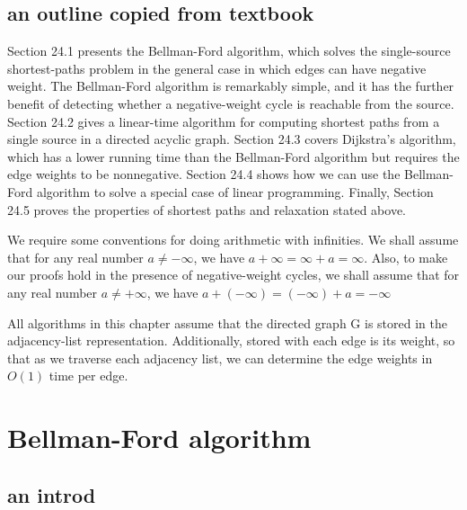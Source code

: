 \documentclass[a4paper, 10pt]{ctexart} %
\begin{document}
\subsection{an outline copied from textbook}
Section 24.1 presents the Bellman-Ford algorithm, which solves the single-source
shortest-paths problem in the general case in which edges can have negative weight.
The Bellman-Ford algorithm is remarkably simple, and it has the further benefit
of detecting whether a negative-weight cycle is reachable from the source. 
Section 24.2 gives a linear-time algorithm for computing shortest paths from a single
source in a directed acyclic graph. Section 24.3 covers Dijkstra's algorithm, which
has a lower running time than the Bellman-Ford algorithm but requires the edge
weights to be nonnegative. Section 24.4 shows how we can use the Bellman-Ford
algorithm to solve a special case of linear programming. Finally, Section 24.5
proves the properties of shortest paths and relaxation stated above.

We require some conventions for doing arithmetic with infinities. We shall assume
that for any real number $a \ne -\infty$, we have $a + \infty  = \infty + a = \infty$. Also, to
make our proofs hold in the presence of negative-weight cycles, we shall assume
that for any real number $a \ne +\infty$, we have $a + \left(- \infty\right) = \left(  - \infty\right) + a =  - \infty$

All algorithms in this chapter assume that the directed graph G is stored in the
adjacency-list representation. Additionally, stored with each edge is its weight, so
that as we traverse each adjacency list, we can determine the edge weights in $O \left(1\right)$ 
time per edge.
\section{Bellman-Ford algorithm}
\subsection{an introd}
\end{document}
